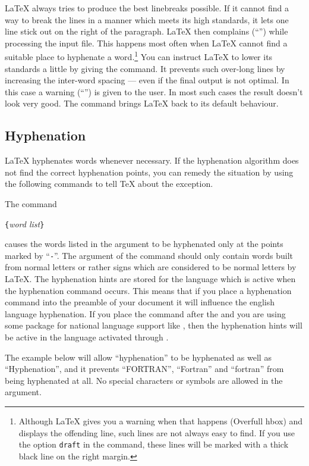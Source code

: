 \LaTeX{} always tries to produce the best linebreaks possible. If it
cannot find a way to break the lines in a manner which meets its high
standards, it lets one line stick out on the right of the paragraph.
\LaTeX{} then complains (``'') while processing the
input file. This happens most often when \LaTeX{} cannot find a
suitable place to hyphenate a word.\footnote{Although \LaTeX{} gives
  you a warning when that happens (Overfull hbox) and displays the
  offending line, such lines are not always easy to find. If you use
  the option \texttt{draft} in the  command, these
  lines will be marked with a thick black line on the right margin.}
You can instruct \LaTeX{} to lower its standards a little by giving
the  command. It prevents such over-long lines by
increasing the inter-word spacing --- even if the final output is not
optimal.  In this case a warning (``'') is given to
the user.  In most such cases the result doesn't look very good. The
command  brings \LaTeX{} back to its default behaviour.

\subsection{Hyphenation} \label{hyph}

\LaTeX{} hyphenates words whenever necessary. If the hyphenation
algorithm does not find the correct hyphenation points, you can
remedy the situation by using the following commands to tell \TeX{}
about the exception.

The command
\begin{lscommand}
\verb|{|\emph{word list}\verb|}|
\end{lscommand}
\noindent causes the words listed in the argument to be hyphenated only at
the points marked by ``\verb|-|''.  The argument of the command should only
contain words built from normal letters or rather signs which are considered
to be normal letters by \LaTeX{}. The hyphenation hints are
stored for the language which is active when the hyphenation command
occurs. This means that if you place a hyphenation command into the preamble
of your document it will influence the english language hyphenation. If you
place the command after the \verb|| and you are using some
package for national language support like , then the hyphenation
hints will be active in the language activated through .

The example below will allow ``hyphenation'' to be hyphenated as well as
``Hyphenation'', and it prevents ``FORTRAN'', ``Fortran'' and ``fortran''
from being hyphenated at all.  No special characters or symbols are allowed
in the argument.

